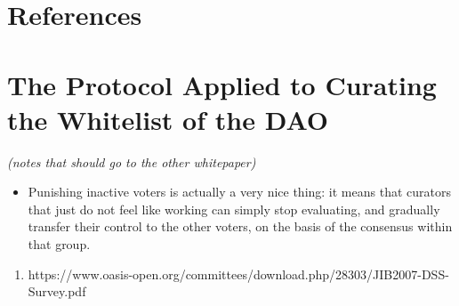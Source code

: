 \documentclass{article}
\begin{document}
\section{References}

\section{The Protocol Applied to Curating the Whitelist of the DAO}

{\em (notes that should go to the other whitepaper) }
\begin{itemize}
\item Punishing inactive voters is actually a very nice thing: it means that curators that just do not feel like working can simply stop evaluating, and gradually transfer their control to the other voters, on the basis of the consensus within that group.
\end{itemize}

\begin{enumerate}
\item https://www.oasis-open.org/committees/download.php/28303/JIB2007-DSS-Survey.pdf
\end{enumerate}
\end{document}
